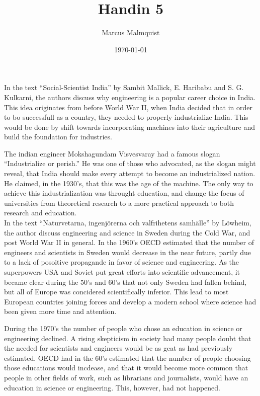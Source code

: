 \documentclass[12pt,a4paper]{IEEEtran}
\title{Handin 5}
\author{Marcus Malmquist}
\date{\today}
\begin{document}
\maketitle
\noindent In the text ``Social-Scientist India'' by Sambit Mallick, E. Haribabu and S. G. Kulkarni, the authors discuss why engineering is a popular career choice in India.
This idea originates from before World War II, when India decided that in order to bo successfull as a country, they needed to properly industrialize India.
This would be done by shift towards incorporating machines into their agriculture and build the foundation for industries.

The indian engineer Mokshagundam Visvesvaray had a famous slogan ``Industrialize or perish.''
He was one of those who advocated, as the slogan might reveal, that India should make every attempt to become an industrialized nation.
He claimed, in the 1930's, that this was the age of the machine.
The only way to achieve this industrialization was throught education, and change the focus of universities from theoretical research to a more practical approach to both research and education.\\

\noindent In the text ``Naturvetarna, ingenjörerna och valfrihetens samhälle'' by Löwheim, the author discuss engineering and science in Sweden during the Cold War, and post World War II in general.
In the 1960's OECD estimated that the number of engineers and scientists in Sweden would decrease in the near future, partly due to a lack of posoitive propagande in favor of science and engineering.
As the superpowers USA and Soviet put great efforts into scientific advancement, it became clear during the 50's and 60's that not only Sweden had fallen behind, but all of Europe was concidered scientifically inferior.
This lead to most European countries joining forces and develop a modern school where science had been given more time and attention.

During the 1970's the number of people who chose an education in science or engineering declined.
A rising skepticism in society had many people doubt that the needed for scientists and engineers would be as geat as had previously estimated.
OECD had in the 60's estimated that the number of people choosing those educations would incdease, and that it would become more common that people in other fields of work, such as librarians and journalists, would have an education in science or engineering.
This, however, had not happened.
\end{document}

